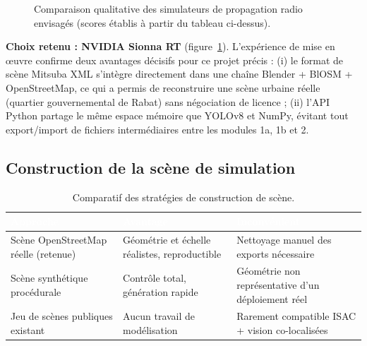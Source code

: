 \documentclass[12pt,a4paper,titlepage]{article}
\newcommand{\hd}[1]{\textcolor{white}{\textbf{#1}}}
\newcommand{\choix}{\rowcolor{tabchoice}}
\begin{document}
\begin{figure}[H]
    \centering
    \caption{Comparaison qualitative des simulateurs de propagation radio envisagés (scores établis à partir du tableau ci-dessus).}
    \label{fig:chart_simulateur}
\end{figure}

\textbf{Choix retenu : NVIDIA Sionna RT} (figure~\ref{fig:chart_simulateur}). L'expérience de mise en \oe uvre confirme deux avantages décisifs pour ce projet précis : (i) le format de scène Mitsuba XML s'intègre directement dans une chaîne Blender + BlOSM + OpenStreetMap, ce qui a permis de reconstruire une scène urbaine réelle (quartier gouvernemental de Rabat) sans négociation de licence ; (ii) l'API Python partage le même espace mémoire que YOLOv8 et NumPy, évitant tout export/import de fichiers intermédiaires entre les modules 1a, 1b et 2.

\subsection{Construction de la scène de simulation}

\begin{table}[H]
    \centering
    \caption{Comparatif des stratégies de construction de scène.}
    \begin{tabularx}{\textwidth}{F{4cm}LL}
        \toprule
        \hd{Approche} & \hd{Avantage} & \hd{Inconvénient} \\
        \midrule
        \choix Scène OpenStreetMap réelle (retenue) & Géométrie et échelle réalistes, reproductible & Nettoyage manuel des exports nécessaire \\
        Scène synthétique procédurale & Contrôle total, génération rapide & Géométrie non représentative d'un déploiement réel \\
        Jeu de scènes publiques existant & Aucun travail de modélisation & Rarement compatible ISAC + vision co-localisées \\
        \bottomrule
    \end{tabularx}
\end{table}
\end{document}
